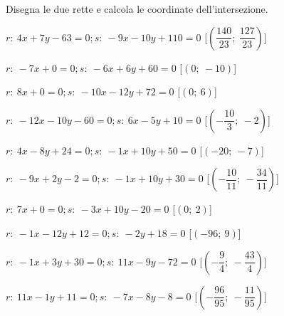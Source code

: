 \begin{esercizio}\label{ese:}
 Disegna le due rette e calcola le coordinate dell'intersezione.
 \begin{enumeratea}
  \item  $r:~4 x + 7 y - 63 = 0; s:~-9 x - 10 y + 110 = 0$ \hfill 
   [$\left(\dfrac{140}{23};~\dfrac{127}{23}\right)$]
  \item  $r:~-7 x + 0 = 0; s:~-6 x + 6 y + 60 = 0$ \hfill 
   [$\left(0;~-10\right)$]
  \item  $r:~8 x + 0 = 0; s:~-10 x - 12 y + 72 = 0$ \hfill 
   [$\left(0;~6\right)$]
  \item  $r:~-12 x - 10 y - 60 = 0; s:~6 x - 5 y + 10 = 0$ \hfill 
   [$\left(-\dfrac{10}{3};~-2\right)$]
  \item  $r:~4 x - 8 y + 24 = 0; s:~-1 x + 10 y + 50 = 0$ \hfill 
   [$\left(-20;~-7\right)$]
  \item  $r:~-9 x + 2 y - 2 = 0; s:~-1 x + 10 y + 30 = 0$ \hfill 
   [$\left(-\dfrac{10}{11};~-\dfrac{34}{11}\right)$]
  \item  $r:~7 x + 0 = 0; s:~-3 x + 10 y - 20 = 0$ \hfill 
   [$\left(0;~2\right)$]
  \item  $r:~-1 x - 12 y + 12 = 0; s:~-2 y + 18 = 0$ \hfill 
   [$\left(-96;~9\right)$]
  \item  $r:~-1 x + 3 y + 30 = 0; s:~11 x - 9 y - 72 = 0$ \hfill 
   [$\left(-\dfrac{9}{4};~-\dfrac{43}{4}\right)$]
  \item  $r:~11 x - 1 y + 11 = 0; s:~-7 x - 8 y - 8 = 0$ \hfill 
   [$\left(-\dfrac{96}{95};~-\dfrac{11}{95}\right)$]
 \end{enumeratea}
\end{esercizio}


